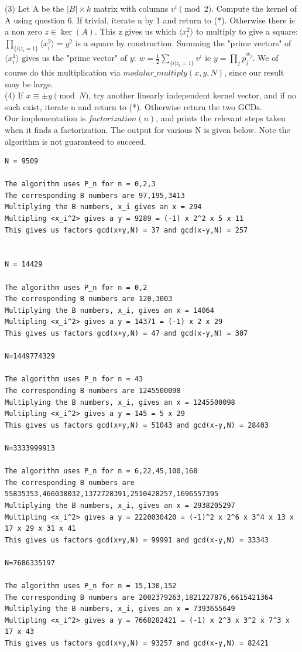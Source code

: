 \documentclass[10pt,a4paper]{report}
\begin{document}
(3) Let A be the $|B|\times k$ matrix with columns $v^{i} \pmod 2$. Compute the kernel of A using question 6. If trivial, iterate n by 1 and return to (*). Otherwise there is a non zero $z \in \ker{(A)}$. This z gives us which $\langle x_i^2 \rangle$ to multiply to give a square:  $\prod_{\{i | z_i = 1\}} \langle x_i^2 \rangle = y^2$ is a square by construction. Summing the "prime vectors" of $\langle x_i^2 \rangle$ gives us  the "prime vector" of $y$:   $w=\frac{1}{2}\sum_{\{i | z_i = 1\}}v^i$ ie $y=\prod_{j}p_j^{w_j}$. We of course do this multiplication via $modular\_multiply(x,y,N)$, since our result may be large. \\

(4) If $x \equiv \pm y \pmod N$, try another linearly independent kernel vector, and if no such exist, iterate n and return to (*). Otherwise return the two GCDs.\\
 
Our implementation is $factorization(n)$, and prints the relevant steps taken when it finds a factorization. The output for various N is given below. Note the algorithm is not guaranteed to succeed.

\begin{lstlisting}[breaklines]	
N = 9509

The algorithm uses P_n for n = 0,2,3
The corresponding B numbers are 97,195,3413
Multiplying the B numbers, x_i gives an x = 294
Multipling <x_i^2> gives a y = 9289 = (-1) x 2^2 x 5 x 11
This gives us factors gcd(x+y,N) = 37 and gcd(x-y,N) = 257


N = 14429

The algorithm uses P_n for n = 0,2
The corresponding B numbers are 120,3003
Multiplying the B numbers, x_i, gives an x = 14064
Multipling <x_i^2> gives a y = 14371 = (-1) x 2 x 29
This gives us factors gcd(x+y,N) = 47 and gcd(x-y,N) = 307

N=1449774329

The algorithm uses P_n for n = 43
The corresponding B numbers are 1245500098
Multiplying the B numbers, x_i, gives an x = 1245500098
Multipling <x_i^2> gives a y = 145 = 5 x 29
This gives us factors gcd(x+y,N) = 51043 and gcd(x-y,N) = 28403

N=3333999913

The algorithm uses P_n for n = 6,22,45,100,168
The corresponding B numbers are 55835353,466038032,1372728391,2510428257,1696557395
Multiplying the B numbers, x_i, gives an x = 2938205297
Multipling <x_i^2> gives a y = 2220030420 = (-1)^2 x 2^6 x 3^4 x 13 x 17 x 29 x 31 x 41
This gives us factors gcd(x+y,N) = 99991 and gcd(x-y,N) = 33343

N=7686335197

The algorithm uses P_n for n = 15,130,152
The corresponding B numbers are 2002379263,1821227876,6615421364
Multiplying the B numbers, x_i, gives an x = 7393655649
Multipling <x_i^2> gives a y = 7668282421 = (-1) x 2^3 x 3^2 x 7^3 x 17 x 43
This gives us factors gcd(x+y,N) = 93257 and gcd(x-y,N) = 82421

\end{lstlisting}
\end{document}
